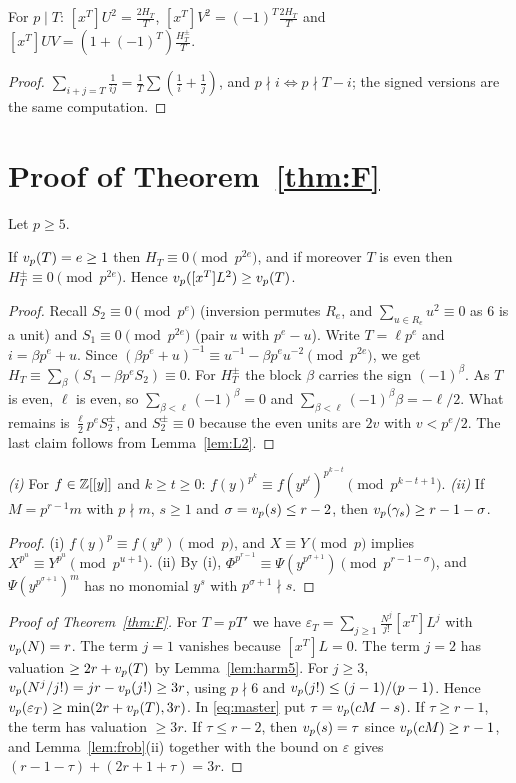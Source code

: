 \documentclass[11pt]{amsart}
\begin{document}
\begin{lemma}\label{lem:L2}
For $p\mid T$: $[x^T]U^2=\frac{2H_T}T$, $[x^T]V^2=(-1)^T\frac{2H_T}T$ and $[x^T]UV=(1+(-1)^T)\frac{H_T^\pm}T$.
\end{lemma}
\begin{proof}
$\sum_{i+j=T}\frac1{ij}=\frac1T\sum(\frac1i+\frac1j)$, and $p\nmid i\iff p\nmid T-i$; the signed versions are the same computation.
\end{proof}

\section{Proof of Theorem~\ref{thm:F}}

Let $p\ge5$.
\begin{lemma}\label{lem:harm5}
If $v_p(T)=e\ge1$ then $H_T\equiv0\pmod{p^{2e}}$, and if moreover $T$ is even then $H_T^\pm\equiv0\pmod{p^{2e}}$. Hence $v_p([x^T]L^2)\ge v_p(T)$.
\end{lemma}
\begin{proof}
Recall $S_2\equiv0\pmod{p^e}$ (inversion permutes $R_e$, and $\sum_{u\in R_e}u^2\equiv0$ as $6$ is a unit) and $S_1\equiv0\pmod{p^{2e}}$ (pair $u$ with $p^e-u$). Write $T=\ell p^e$ and $i=\beta p^e+u$. Since $(\beta p^e+u)^{-1}\equiv u^{-1}-\beta p^eu^{-2}\pmod{p^{2e}}$, we get $H_T\equiv\sum_\beta(S_1-\beta p^eS_2)\equiv0$. For $H_T^\pm$ the block $\beta$ carries the sign $(-1)^\beta$. As $T$ is even, $\ell$ is even, so $\sum_{\beta<\ell}(-1)^\beta=0$ and $\sum_{\beta<\ell}(-1)^\beta\beta=-\ell/2$. What remains is $\frac\ell2p^eS_2^\pm$, and $S_2^\pm\equiv0$ because the even units are $2v$ with $v<p^e/2$. The last claim follows from Lemma~\ref{lem:L2}.
\end{proof}

\begin{lemma}\label{lem:frob}
\emph{(i)} For $f\in\mathbb{Z}[[y]]$ and $k\ge t\ge0$: $f(y)^{p^k}\equiv f(y^{p^t})^{p^{k-t}}\pmod{p^{k-t+1}}$. \emph{(ii)} If $M=p^{r-1}m$ with $p\nmid m$, $s\ge1$ and $\sigma=v_p(s)\le r-2$, then $v_p(\gamma_s)\ge r-1-\sigma$.
\end{lemma}
\begin{proof}
(i) $f(y)^p\equiv f(y^p)\pmod p$, and $X\equiv Y\pmod p$ implies $X^{p^u}\equiv Y^{p^u}\pmod{p^{u+1}}$. (ii) By (i), $\Phi^{p^{r-1}}\equiv\Psi(y^{p^{\sigma+1}})\pmod{p^{r-1-\sigma}}$, and $\Psi(y^{p^{\sigma+1}})^m$ has no monomial $y^s$ with $p^{\sigma+1}\nmid s$.
\end{proof}

\begin{proof}[Proof of Theorem~\ref{thm:F}]
For $T=pT'$ we have $\varepsilon_T=\sum_{j\ge1}\frac{N^j}{j!}[x^T]L^j$ with $v_p(N)=r$. The term $j=1$ vanishes because $[x^T]L=0$. The term $j=2$ has valuation $\ge2r+v_p(T)$ by Lemma~\ref{lem:harm5}. For $j\ge3$, $v_p(N^j/j!)=jr-v_p(j!)\ge3r$, using $p\nmid6$ and $v_p(j!)\le(j-1)/(p-1)$. Hence $v_p(\varepsilon_T)\ge\min(2r+v_p(T),3r)$. In \eqref{eq:master} put $\tau=v_p(cM-s)$. If $\tau\ge r-1$, the term has valuation $\ge3r$. If $\tau\le r-2$, then $v_p(s)=\tau$ since $v_p(cM)\ge r-1$, and Lemma~\ref{lem:frob}(ii) together with the bound on $\varepsilon$ gives $(r-1-\tau)+(2r+1+\tau)=3r$.
\end{proof}
\end{document}
